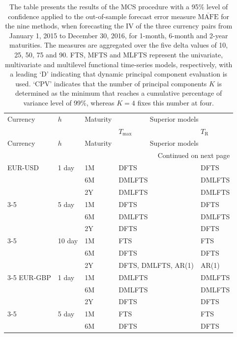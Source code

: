 \documentclass[12pt,a4paper]{article}
\begin{document}
\begin{center}
\tabcolsep 0.16in
\renewcommand{\arraystretch}{1}
\begin{longtable}{@{}lllll@{}}
\caption{\small{The table presents the results of the MCS procedure with a 95\% level of confidence applied to the out-of-sample forecast error measure $\overline{\text{MAFE}}$ for the nine methods, when forecasting the IV of the three currency pairs from January 1, 2015 to December 30, 2016, for 1-month, 6-month and 2-year maturities. The measures are aggregated over the five delta values of 10, 25, 50, 75 and 90. FTS, MFTS and MLFTS represent the univariate, multivariate and multilevel functional time-series models, respectively, with a leading `D' indicating that dynamic principal component evaluation is used. `CPV' indicates that the number of principal components $K$ is determined as the minimum that reaches a cumulative percentage of variance level of 99\%, whereas $K=4$ fixes this number at four.}}\label{tab:7}\\
\toprule
Currency & $h$ & Maturity & \multicolumn{2}{c}{Superior models}   \\
& & & $T_{\max}$ & $T_{\text{R}}$ \\ 
\hline
\endfirsthead
Currency & $h$ & Maturity & \multicolumn{2}{c}{Superior models}   \\\hline
\endhead
\hline  \multicolumn{5}{r}{{Continued on next page}} \\ 
\endfoot
\endlastfoot
EUR-USD & 1 day 	& 1M &  DFTS & DFTS		\\
		 & 		& 6M &  DMLFTS & DMLFTS		\\
		& 		& 2Y &   DMLFTS & DMLFTS		\\
		\cmidrule{3-5} 
		& 5 day 	& 1M & DFTS & DFTS		\\
		&		& 6M & DMLFTS & DMLFTS		\\
		&		& 2Y & DFTS & DFTS		\\
		\cmidrule{3-5}
		& 10 day   & 1M & FTS & FTS		\\
		&		& 6M & DFTS & DFTS		\\
		&		& 2Y & DFTS, DMLFTS, AR(1) & AR(1)		\\
		\cmidrule{3-5}
EUR-GBP & 1 day 	& 1M & DMLFTS & DMLFTS	\\
		& 		& 6M & DMLFTS & DMLFTS		\\
		&		& 2Y & DFTS &	 DFTS	\\
		\cmidrule{3-5}
		& 5 day 	& 1M & FTS & FTS		\\
		&		& 6M & DFTS & DFTS		\\

\end{longtable}
\end{center}
\end{document}
